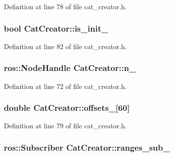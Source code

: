 \-Definition at line 78 of file cat\-\_\-creator.\-h.

\subsubsection[{is\-\_\-init\-\_\-}]{\setlength{\rightskip}{0pt plus 5cm}bool {\bf \-Cat\-Creator\-::is\-\_\-init\-\_\-}\hspace{0.3cm}{\ttfamily  [private]}}\label{classCatCreator_abd3547835085628b098dc1319dd17841}


\-Definition at line 82 of file cat\-\_\-creator.\-h.

\subsubsection[{n\-\_\-}]{\setlength{\rightskip}{0pt plus 5cm}ros\-::\-Node\-Handle {\bf \-Cat\-Creator\-::n\-\_\-}\hspace{0.3cm}{\ttfamily  [private]}}\label{classCatCreator_a157aa9ec24dd1fc6c4bf50324afbcb9e}


\-Definition at line 72 of file cat\-\_\-creator.\-h.

\subsubsection[{offsets\-\_\-}]{\setlength{\rightskip}{0pt plus 5cm}double {\bf \-Cat\-Creator\-::offsets\-\_\-}[60]\hspace{0.3cm}{\ttfamily  [private]}}\label{classCatCreator_a0e4dbc1ff33a62d8b44f0586c80f0d47}


\-Definition at line 79 of file cat\-\_\-creator.\-h.

\subsubsection[{ranges\-\_\-sub\-\_\-}]{\setlength{\rightskip}{0pt plus 5cm}ros\-::\-Subscriber {\bf \-Cat\-Creator\-::ranges\-\_\-sub\-\_\-}\hspace{0.3cm}{\ttfamily  [private]}}\label{classCatCreator_aad5e42c6bd347bc5d942d80ed0da529f}


